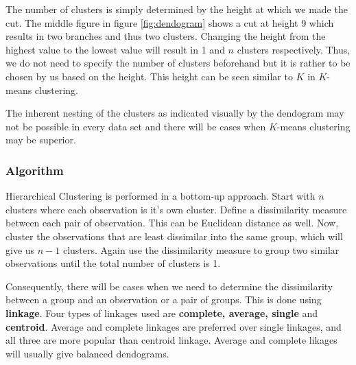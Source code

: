 \documentclass[11pt, a4paper]{article}
\begin{document}
    The number of clusters is simply determined by the height at which we made the cut. The middle figure in figure \ref{fig:dendogram} shows a cut at height 9 which results in two branches and thus two clusters.\newline
    Changing the height from the highest value to the lowest value will result in 1 and $n$ clusters respectively. Thus, we do not need to specify the number of clusters beforehand but it is rather to be chosen by us based on the height. This height can be seen similar to $K$ in $K$-means clustering.\newline

    The inherent nesting of the clusters as indicated visually by the dendogram may not be possible in every data set and there will be cases when $K$-means clustering may be superior.


    \subsubsection{Algorithm}
    Hierarchical Clustering is performed in a bottom-up approach. Start with $n$ clusters where each observation is it's own cluster. Define a dissimilarity measure between each pair of observation. This can be Euclidean distance as well. Now, cluster the observations that are least dissimilar into the same group, which will give us $n-1$ clusters. Again use the dissimilarity measure to group two similar observations until the total number of clusters is 1.\newline

    Consequently, there will be cases when we need to determine the dissimilarity between a group and an observation or a pair of groups. This is done using \textbf{linkage}. Four types of linkages used are \textbf{complete, average, single} and \textbf{centroid}. Average and complete linkages are preferred over single linkages, and all three are more popular than centroid linkage. Average and complete likages will usually give balanced dendograms.\newline
\end{document}
